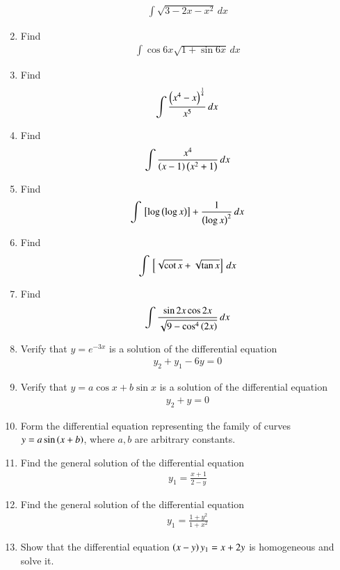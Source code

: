 \begin{enumerate}[label=\arabic*.,ref=\thesubsection.\theenumi]
\begin{align}
\int \sqrt{3-2x-x^2}\,dx
\end{align}
\item Find
\begin{align}
\int\cos  6x\sqrt{1+\sin6x} \,dx
\end{align}
%
\item Find
\begin{align}
\int \frac{\left(x^4-x\right)^{\frac{1}{4}}}{x^5} \,dx
\end{align}
%
\item Find
\begin{align}
\int \frac{x^4}{\left(x-1\right)\left(x^2+1\right)} \,dx
\end{align}
%
\item Find
\begin{align}
\int {}\left[\log \left(\log x\right)\right]+\frac{1}{\left(\log x\right)^2} \,dx
\end{align}
%
\item Find
\begin{align}
\int {}\left[\sqrt{\cot x} + \sqrt{\tan x} \right]\,dx
\end{align}
%
\item Find
\begin{align}
\int \frac{\sin 2x \cos 2x }{\sqrt{9-\cos^4\left(2x\right)}}\,dx
\end{align}
%
\item Verify that $y = e^{-3x}$ is a solution of the differential equation 
\begin{align}
y_2 +y_1 -6y = 0
\end{align}
%
\item Verify that $y = a\cos x + b \sin x$ is a solution of the differential equation 
\begin{align}
y_2 +y = 0
\end{align}
%
\item Form the differential equation representing the family of curves $y = a\sin\left(x+b\right)$, where $a, b$ are arbitrary constants.
%
\item Find the general solution of the differential equation
%
\begin{align}
y_1  = \frac{x+1}{2-y}
\end{align}
%
\item Find the general solution of the differential equation
%
\begin{align}
y_1  = \frac{1+y^2}{1+x^2}
\end{align}
%
%
\item Show that the differential equation $\left(x-y\right)y_1 = x + 2y$ is homogeneous and solve it.

\end{enumerate}
